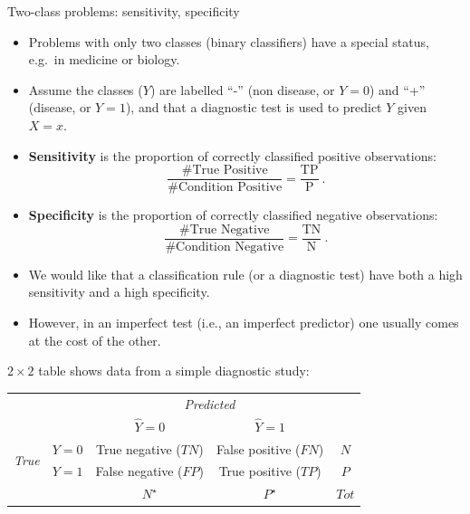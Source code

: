 \documentclass[
  10pt,
  ignorenonframetext,
]{beamer}
\providecommand{\tightlist}{%
  \setlength{\itemsep}{0pt}\setlength{\parskip}{0pt}}
\begin{document}
\begin{frame}{Two-class problems: sensitivity, specificity}
\protect\hypertarget{two-class-problems-sensitivity-specificity}{}
\begin{itemize}
\item
  Problems with only two classes (binary classifiers) have a special
  status, e.g.~in medicine or biology.
\item
  Assume the classes (\(Y\)) are labelled ``-'' (non disease, or
  \(Y=0\)) and ``+'' (disease, or \(Y=1\)), and that a diagnostic test
  is used to predict \(Y\) given \(X=x\).
\item
  \textbf{Sensitivity} is the proportion of correctly classified
  positive observations:
  \[\frac{\# \text{True Positive}}{\# \text{Condition Positive}}=\frac{\text{TP}}{\text{P}} \ .\]
\item
  \textbf{Specificity} is the proportion of correctly classified
  negative observations:
  \[\frac{\# \text{True Negative}}{\# \text{Condition Negative}}=\frac{\text{TN}}{\text{N}} \ .\]
\end{itemize}
\end{frame}

\begin{frame}
\begin{itemize}
\tightlist
\item
  We would like that a classification rule (or a diagnostic test) have
  both a high sensitivity and a high specificity.
\end{itemize}

\vspace{2mm}

\begin{itemize}
\tightlist
\item
  However, in an imperfect test (i.e., an imperfect predictor) one
  usually comes at the cost of the other.
\end{itemize}

\vspace{2mm}

\(2 \times 2\) table shows data from a simple diagnostic study:

\begin{center}
\begin{tabular}{ll|cc|c}
& & \multicolumn{2}{c}{\emph{Predicted}} \\
& & $\hat{Y}=0$ & $\hat{Y}=1$ \\ 
\hline
\multirow{2}{*}{\emph{True}} & $Y=0$ & True negative ($TN$) & False positive ($FN$) & $N$\\
 & $Y=1$ & False negative ($FP$) & True positive ($TP$) & $P$\\
\hline
& & $N^\star$ & $P^\star$ & $Tot$ 
\end{tabular}
\end{center}
\end{frame}
\end{document}
